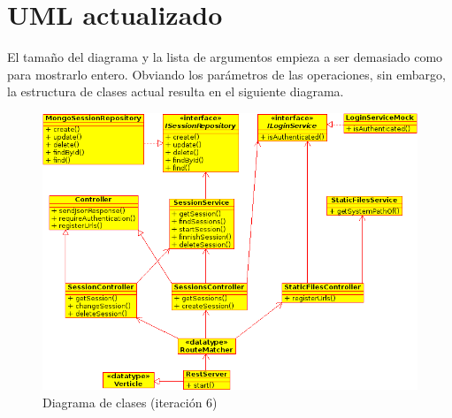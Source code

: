 \section{UML actualizado}

El tamaño del diagrama y la lista de argumentos empieza a ser demasiado como para mostrarlo
entero. Obviando los parámetros de las operaciones, sin embargo, la estructura de clases
actual resulta en el siguiente diagrama.

\begin{figure}[h]
 \includegraphics[scale=0.8]{diagrams/class_diagram_iter6.png}
 \caption{Diagrama de clases (iteración 6)}
 \label{fig:clases}
\end{figure} 
